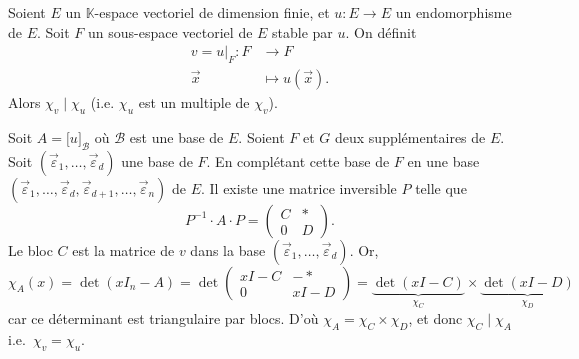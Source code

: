 \begin{prop}
	Soient $E$\/ un $\mathds{K}$-espace vectoriel de dimension finie, et $u : E \to E$\/ un endomorphisme de $E$. Soit $F$\/ un sous-espace vectoriel de $E$\/ stable par $u$. On définit \begin{align*}
		v = u\big|_F: F &\longrightarrow F \\
		\vec{x} &\longmapsto u(\vec{x}).
	\end{align*}
	Alors $\chi_v  \mid \chi_u$ (i.e. $\chi_u$\/ est un multiple de $\chi_v$).
\end{prop}

\begin{prv}
	Soit $A = \big[u\big]_\mathscr{B}$\/ où $\mathscr{B}$\/ est une base de $E$.
	Soient $F$\/ et $G$\/ deux supplémentaires de $E$.
	Soit $(\vec{\varepsilon}_1, \ldots, \vec{\varepsilon}_d)$\/ une base de $F$. En complétant cette base de $F$\/ en une base $(\vec{\varepsilon}_1, \ldots, \vec{\varepsilon}_d, \vec{\varepsilon}_{d+1}, \ldots, \vec{\varepsilon}_n)$\/ de $E$. Il existe une matrice inversible $P$\/ telle que \[
		P^{-1}\cdot A\cdot P = 
		\left(\begin{array}{c|c}
			C&*\\ \hline
			0&D
		\end{array}\right)
	.\]
	Le bloc $C$\/ est la matrice de $v$\/ dans la base $(\vec{\varepsilon}_1, \ldots, \vec{\varepsilon}_d)$. Or, \[
		\chi_A(x) = \det(x I_n - A) = \det
		\left(\begin{array}{c|c}
				xI - C&-*\\ \hline
				0&xI - D
		\end{array}\right) = \underbrace{\det(xI - C)}_{\chi_C} \times \underbrace{\det(xI - D)}_{\chi_D}
	\] car ce déterminant est triangulaire par blocs.
	D'où $\chi_A = \chi_C \times \chi_D$, et donc $\chi_C  \mid \chi_A$\/ i.e.\ $\chi_v = \chi_u$.
\end{prv}

